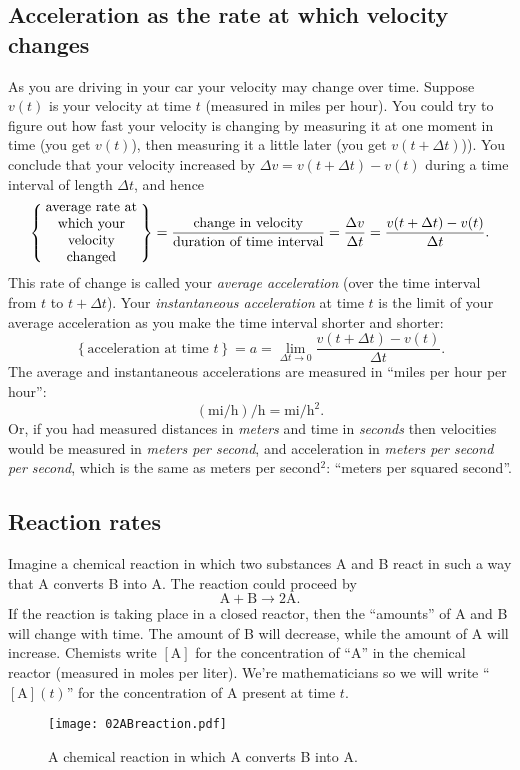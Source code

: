 \subsection{Acceleration as the rate at which velocity changes} 
As you are driving in your car your velocity may change over time.  Suppose
$v(t)$ is your velocity at time $t$ (measured in miles per hour).  You could try
to figure out how fast your velocity is changing by measuring it at one moment
in time (you get $v(t)$), then measuring it a little later (you get $v(t+\Delta
t)$)).  You conclude that your velocity increased by $\Delta v = v(t+ \Delta t)
- v(t)$ during a time interval of length $\Delta t$, and hence
\begin{multline*}
  \left\{
    \parbox{7em}{\centering average rate at which your velocity changed}
  \right\}
  = \frac{\text{change in velocity}}{\text{duration of time interval}}
  =\frac{\Delta v}{\Delta t} =\frac{v(t+ \Delta t) - v(t)}{\Delta t}.
\end{multline*}
This rate of change is called your \textit{average acceleration} (over the time
interval from $t$ to $t+\Delta t$).  Your \textit{instantaneous acceleration} at
time $t$ is the limit of your average acceleration as you make the time interval
shorter and shorter:
\[
\left\{ \text{acceleration at time $t$} \right\} = a = \lim_{\Delta t\to 0}
\frac{v(t+ \Delta t) - v(t)}{\Delta t}.
\]
The average and instantaneous accelerations are measured in ``miles per hour per
hour'':
\[
(\textrm{mi}/\textrm{h})/\textrm{h} = \textrm{mi}/\textrm{h}^2.
\]
Or, if you had measured distances in \textit{meters} and time in
\textit{seconds} then velocities would be measured in \textit{meters per
  second}, and acceleration in \textit{meters per second per second}, which is
the same as meters per second$^2$: ``meters per squared second''.




\subsection{Reaction rates} 
Imagine a chemical reaction in which two substances A and B react in such a way
that A converts B into A.  The reaction could proceed by
\[
\textrm{A} +  \textrm{B} \longrightarrow 2\textrm{A}.
\]
If the reaction is taking place in a closed reactor, then the ``amounts'' of A
and B will change with time.  The amount of B will decrease, while the amount of
A will increase.  Chemists write $[\textrm{A}]$ for the concentration of ``A''
in the chemical reactor (measured in moles per liter).  We're mathematicians so
we will write ``$[\textrm{A}](t)$'' for the concentration of A present at time
$t$.
\begin{figure}[h]
  \begin{center}
    \texttt{[image: 02ABreaction.pdf]}
  \end{center}
  \caption{A chemical reaction in which A converts B into A.}
  \label{fig:02ABreaction}
\end{figure}


